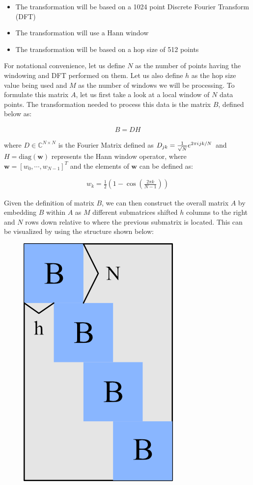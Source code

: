 \documentclass{article}[12pt]
\newcommand{\iu}{{i\mkern1mu}}
\begin{document}
\begin{itemize}
\item The transformation will be based on a 1024 point Discrete Fourier Transform (DFT)
\item The transformation will use a Hann window
\item The transformation will be based on a hop size of 512 points
\end{itemize}

For notational convenience, let us define $N$ as the number of points having the windowing and DFT performed on them. Let us also define $h$ as the hop size value being used and $M$ as the number of windows we will be processing. To formulate this matrix $A$, let us first take a look at a local window of $N$ data points. The transformation needed to process this data is the matrix $B$, defined below as:

\begin{align*}
B = DH
\end{align*}

where $D \in \mathbb{C}^{N \times N}$ is the Fourier Matrix defined as $D_{jk} = \frac{1}{\sqrt{N}}e^{2\pi \iu j k /N  }$ and $H = \text{diag}(\boldsymbol{w})$ represents the Hann window operator, where $\boldsymbol{w} = [w_0, \cdots, w_{N-1}]^{T}$ and the elements of $\boldsymbol{w}$ can be defined as:

\begin{align*}
w_k = \frac{1}{2} \left( 1 - \cos\left(\frac{2 \pi k}{N-1}\right)\right)
\end{align*}

\newpage
Given the definition of matrix $B$, we can then construct the overall matrix $A$ by embedding $B$ within $A$ as $M$ different submatrices shifted $h$ columns to the right and $N$ rows down relative to where the previous submatrix is located. This can be visualized by using the structure shown below:

\begin{figure}[h]
\includegraphics[scale=0.4]{block_matrix}
\centering
\end{figure}
\end{document}
